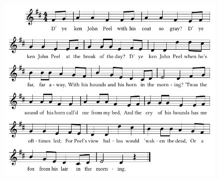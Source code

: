\vfill

\begin{figure}[h]
  \centering
  \includegraphics[width=\textwidth]{gazette/john-peel.pdf}
\end{figure}

\endgroup
